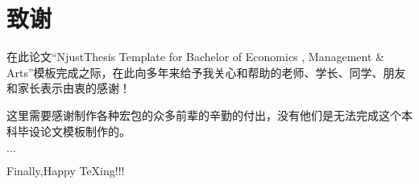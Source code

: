 \chapter*{致\quad 谢}

\songti\xiaosi
\begin{spacing}{1.5}

在此论文“NjustThesis Template for Bachelor of Economics , Management \& Arts”模板完成之际，在此向多年来给予我关心和帮助的老师、学长、同学、朋友和家长表示由衷的感谢！

这里需要感谢制作\CTeX 各种宏包的众多前辈的辛勤的付出，没有他们是无法完成这个本科毕设论文模板制作的。

$\dots$


Finally,Happy TeXing!!!

\end{spacing}
